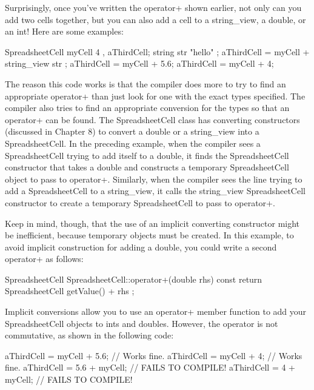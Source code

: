 
Surprisingly, once you’ve written the operator+ shown earlier, not only can you add two cells together, but you can also add a cell to a string\_view, a double, or an int! Here are some examples:

\begin{cpp}
SpreadsheetCell myCell { 4 }, aThirdCell;
string str { "hello" };
aThirdCell = myCell + string_view{ str };
aThirdCell = myCell + 5.6;
aThirdCell = myCell + 4;
\end{cpp}

The reason this code works is that the compiler does more to try to find an appropriate operator+ than just look for one with the exact types specified. The compiler also tries to find an appropriate conversion for the types so that an operator+ can be found. The SpreadsheetCell class has converting constructors (discussed in Chapter 8) to convert a double or a string\_view into a SpreadsheetCell. In the preceding example, when the compiler sees a SpreadsheetCell trying to add itself to a double, it finds the SpreadsheetCell constructor that takes a double and constructs a temporary SpreadsheetCell object to pass to operator+. Similarly, when the compiler sees the line trying to add a SpreadsheetCell to a string\_view, it calls the string\_view SpreadsheetCell constructor to create a temporary SpreadsheetCell to pass to operator+.

Keep in mind, though, that the use of an implicit converting constructor might be inefficient, because temporary objects must be created. In this example, to avoid implicit construction for adding a double, you could write a second operator+ as follows:

\begin{cpp}
SpreadsheetCell SpreadsheetCell::operator+(double rhs) const
{
    return SpreadsheetCell { getValue() + rhs };
}
\end{cpp}


Implicit conversions allow you to use an operator+ member function to add your SpreadsheetCell objects to ints and doubles. However, the operator is not commutative, as shown in the following code:

\begin{cpp}
aThirdCell = myCell + 5.6; // Works fine.
aThirdCell = myCell + 4; // Works fine.
aThirdCell = 5.6 + myCell; // FAILS TO COMPILE!
aThirdCell = 4 + myCell; // FAILS TO COMPILE!
\end{cpp}

